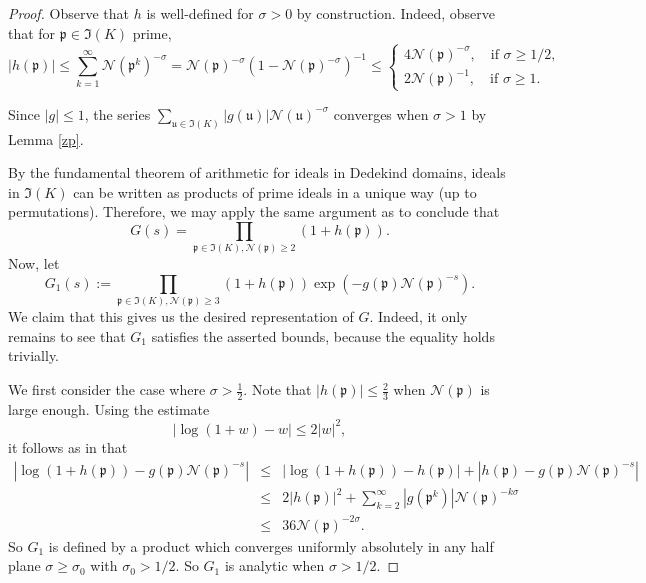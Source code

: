 \documentclass[11pt]{amsart}
\theoremstyle{definition}
\newcommand{\NN}{{\mathcal N}}
\newcommand{\mf}{\mathfrak}
\begin{document}
\begin{proof}
Observe that $h$ is well-defined for $\sigma>0$ by construction. Indeed, observe that for $\mf p \in \mf I(K)$ prime,  
\[
|h(\mf p)| \leq \sum_{k=1}^{\infty} \NN(\mf p^k)^{-\sigma}=\NN(\mf p)^{-\sigma}(1-\NN(\mf p)^{-\sigma})^{-1} \leq
\begin{cases}
    4\NN(\mf p)^{-\sigma}, \quad \text{if } \sigma \geq 1/2, \\
    2\NN(\mf p)^{-1}, \quad \text{if } \sigma \geq 1.
\end{cases}
\]

Since $|g|\leq 1$,   the series
$\sum_{\mf u \in \mf I(K)} |g(\mf u)| \NN(\mf u)^{-\sigma}$ converges when $\sigma>1$ by Lemma \ref{zp}.

By the fundamental theorem of arithmetic for ideals in Dedekind domains, ideals in $\mf I(K)$ can be written as products of prime ideals in a unique way (up to permutations). Therefore, we may apply the same argument as \cite[Lemma~6.6]{E79book} to conclude  that 
\[
G(s)=\prod_{\mf p \in \mf I(K), \NN(\mf p)\geq 2} (1+h(\mf p)).
\]
Now, let $$G_1(s):= \prod_{\mf p \in \mf I(K), \NN(\mf p)\geq 3} (1+h(\mf p)) \exp(-g(\mf p)\NN(\mf p)^{-s}).$$ We claim that this gives us the desired representation of $G$. Indeed, it only remains to see that $G_1$ satisfies the asserted bounds, because the equality holds trivially.

We first consider the case where $\sigma>\frac{1}{2}$. Note that    $|h(\mf p)| \leq \frac{2}{3}$ when $\NN(\mf p)$ is large enough. Using the estimate
\[
|\log(1+w)-w| \leq 2|w|^2,
\]
it follows as in \cite[Lemma~6.6]{E79book} that
\begin{eqnarray*}
    |\log(1+h(\mf p))-g(\mf p)\NN(\mf p)^{-s}| & \leq & |\log (1+h(\mf p))-h(\mf p)|+|h(\mf p)-g(\mf p) \NN(\mf p)^{-s}| \\ & \leq &
2|h(\mf p)|^2+\sum_{k=2}^{\infty} |g(\mf p^k)| \NN(\mf p)^{-k\sigma}\\ & \leq & 36\NN(\mf p)^{-2\sigma}.
\end{eqnarray*}
So $G_{1}$ is defined by a product which converges uniformly absolutely in any half plane $\sigma\geq\sigma_{0}$ with $\sigma_{0}>1/2$. 
So $G_{1}$ is analytic when $\sigma>1/2$.


\end{proof}
\end{document}
